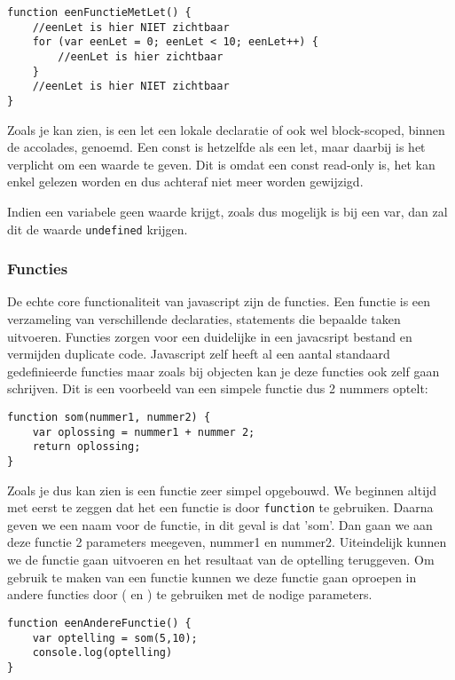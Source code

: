 \begin{lstlisting}[frame=single, caption=Een functie met let]
function eenFunctieMetLet() {
	//eenLet is hier NIET zichtbaar
	for (var eenLet = 0; eenLet < 10; eenLet++) {
		//eenLet is hier zichtbaar
	}
	//eenLet is hier NIET zichtbaar
}
\end{lstlisting}

Zoals je kan zien, is een let een lokale declaratie of ook wel block-scoped, binnen de accolades, genoemd. Een const is hetzelfde als een let, maar daarbij is het verplicht om een waarde te geven. Dit is omdat een const read-only is, het kan enkel gelezen worden en dus achteraf niet meer worden gewijzigd.

Indien een variabele geen waarde krijgt, zoals dus mogelijk is bij een var, dan zal dit de waarde \lstinline[basicstyle=\ttfamily\color{red}]|undefined| krijgen.

\subsubsection{Functies}
\label{sssec:functies}
De echte core functionaliteit van javascript zijn de functies. Een functie is een verzameling van verschillende declaraties, statements die bepaalde taken uitvoeren. Functies zorgen voor een duidelijke in een javacsript bestand en vermijden duplicate code. Javascript zelf heeft al een aantal standaard gedefinieerde functies maar zoals bij objecten kan je deze functies ook zelf gaan schrijven. Dit is een voorbeeld van een simpele functie dus 2 nummers optelt:

\begin{lstlisting}[frame=single, caption=Een functie die 2 getallen optelt]
function som(nummer1, nummer2) {
	var oplossing = nummer1 + nummer 2;
	return oplossing;
}
\end{lstlisting}

Zoals je dus kan zien is een functie zeer simpel opgebouwd. We beginnen altijd met eerst te zeggen dat het een functie is door \lstinline[basicstyle=\ttfamily\color{red}]|function| te gebruiken. Daarna geven we een naam voor de functie, in dit geval is dat 'som'. Dan gaan we aan deze functie 2 parameters meegeven, nummer1 en nummer2. Uiteindelijk kunnen we de functie gaan uitvoeren en het resultaat van de optelling teruggeven. Om gebruik te maken van een functie kunnen we deze functie gaan oproepen in andere functies door ( en ) te gebruiken met de nodige parameters.

\begin{lstlisting}[frame=single, caption=Een functie de som functie oproept]
function eenAndereFunctie() {
	var optelling = som(5,10);
	console.log(optelling)
}
\end{lstlisting}

